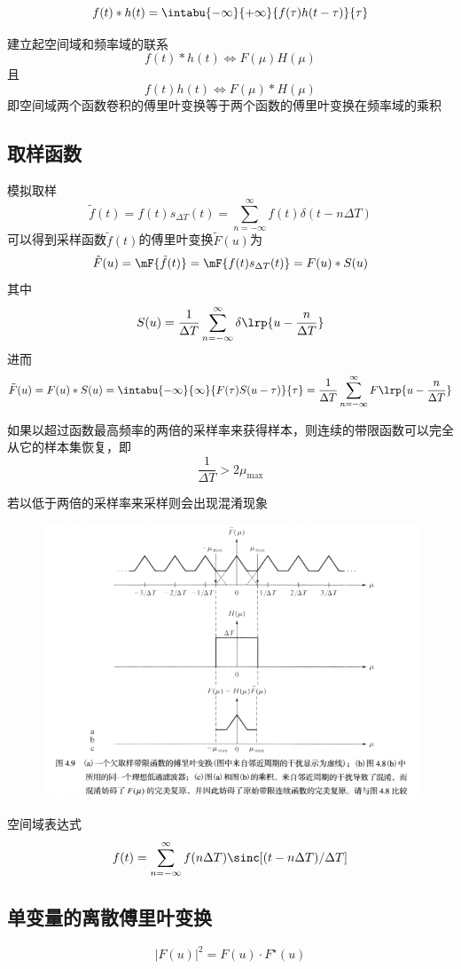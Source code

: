 \begin{definition}[卷积]
\[f(t)*h(t)=\intabu{-\infty}{+\infty}{f(\tau)h(t-\tau)}{\tau}\]
\end{definition}
\begin{theorem}[卷积定理]
建立起空间域和频率域的联系
\[f(t)*h(t)\iff F(\mu)H(\mu)\]
且
\[f(t)h(t)\iff F(\mu)*H(\mu)\]
即空间域两个函数卷积的傅里叶变换等于两个函数的傅里叶变换在频率域的乘积
\end{theorem}


\subsection{取样函数}
模拟取样
\[\tilde{f}(t)=f(t)s_{\Delta T}(t)=\sum_{n=-\infty}^\infty f(t)\delta(t-n\Delta T)\]
可以得到采样函数$\tilde{f}(t)$的傅里叶变换$\tilde{F}(u)$为
\[\tilde{F}(u)=\mF\{\tilde{f}(t)\}=\mF\{f(t)s_{\Delta T}(t)\}=F(u)*S(u)\]
其中
\[S(u)=\frac{1}{\Delta T}\sum_{n=-\infty}^{\infty}\delta\lrp{u-\frac{n}{\Delta T}}\]
进而
\[\tilde{F}(u)=F(u)*S(u)=\intabu{-\infty}{\infty}{F(\tau)S(u-\tau)}{\tau}=\frac{1}{\Delta T}\sum_{n=-\infty}^{\infty}F\lrp{u-\frac{n}{\Delta T}}\]
\begin{theorem}
如果以超过函数最高频率的两倍的采样率来获得样本，则连续的带限函数可以完全从它的样本集恢复，即
\[\frac{1}{\Delta T}>2\mu_{\max}\]
\end{theorem}

若以低于两倍的采样率来采样则会出现混淆现象
\begin{figure}[H]
\centering
\includegraphics[width=\linewidth]{fig/nyquist.png}
\end{figure}

空间域表达式
\[f(t)=\sum_{n=-\infty}^{\infty}f(n\Delta T)\sinc[(t-n\Delta T)/\Delta T]\]

\subsection{单变量的离散傅里叶变换}
\[|F(u)|^2=F(u)\cdot F^\star(u)\]